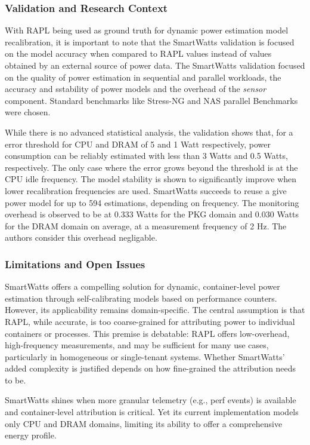 \subsubsection{Validation and Research Context}
\label{sec:smartwatts-validation}
With RAPL being used as ground truth for dynamic power estimation model recalibration, it is important to note that the SmartWatts validation is focused on the model accuracy when compared to RAPL values instead of values obtained by an external source of power data. The SmartWatts validation focused on the quality of power estimation in sequential and parallel workloads, the accuracy and sstability of power models and the overhead of the \textit{sensor} component. Standard benchmarks like Stress-NG and NAS parallel Benchmarks were chosen. 

While there is no advanced statistical analysis, the validation shows that, for a error threshold for CPU and DRAM of 5 and 1 Watt respectively, power consumption can be reliably estimated with less than 3 Watts and 0.5 Watts, respectively. The only case where the error grows beyond the threshold is at the CPU idle frequency. The model stability is shown to significantly improve when lower recalibration frequencies are used. SmartWatts succeeds to reuse a give power model for up to 594 estimations, depending on frequency. The monitoring overhead is observed to be at 0.333 Watts for the PKG domain and 0.030 Watts for the DRAM domain on average, at a measurement frequency of 2 Hz. The authors consider this overhead negligable.
\subsubsection{Limitations and Open Issues}
\label{sec:smartwatts-limitations}
SmartWatts offers a compelling solution for dynamic, container-level power estimation through self-calibrating models based on performance counters. However, its applicability remains domain-specific. The central assumption is that RAPL, while accurate, is too coarse-grained for attributing power to individual containers or processes. This premise is debatable: RAPL offers low-overhead, high-frequency measurements, and may be sufficient for many use cases, particularly in homogeneous or single-tenant systems. Whether SmartWatts' added complexity is justified depends on how fine-grained the attribution needs to be.

SmartWatts shines when more granular telemetry (e.g., perf events) is available and container-level attribution is critical. Yet its current implementation models only CPU and DRAM domains, limiting its ability to offer a comprehensive energy profile.

